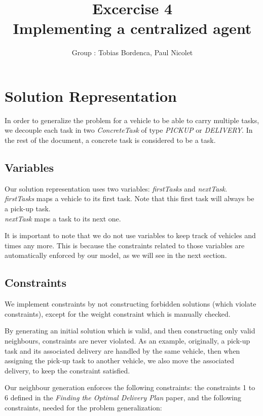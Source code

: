 \documentclass[11pt]{article}
\title{\bf Excercise 4\\ Implementing a centralized agent}
\author{Group \textnumero 1: Tobias Bordenca, Paul Nicolet}
\begin{document}
\maketitle

\section{Solution Representation}
In order to generalize the problem for a vehicle to be able to carry multiple tasks, we decouple each task in two \textit{ConcreteTask} of type \textit{PICKUP} or \textit{DELIVERY}. In the rest of the document, a concrete task is considered to be a task.

\subsection{Variables}
Our solution representation uses two variables: \textit{firstTasks} and \textit{nextTask}.\\
\textit{firstTasks} maps a vehicle to its first task. Note that this first task will always be a pick-up task.\\
\textit{nextTask} maps a task to its next one.

It is important to note that we do not use variables to keep track of vehicles and times any more. This is because the constraints related to those variables are automatically enforced by our model, as we will see in the next section.

\subsection{Constraints}
We implement constraints by not constructing forbidden solutions (which violate constraints), except for the weight constraint which is manually checked. 

By generating an initial solution which is valid, and then constructing only valid neighbours, constraints are never violated. As an example, originally, a pick-up task and its associated delivery are handled by the same vehicle, then when assigning the pick-up task to another vehicle, we also move the associated delivery, to keep the constraint satisfied.

Our neighbour generation enforces the following constraints: the constraints 1 to 6 defined in the \textit{Finding the Optimal Delivery Plan} paper, and the following constraints, needed for the problem generalization: 
\end{document}
